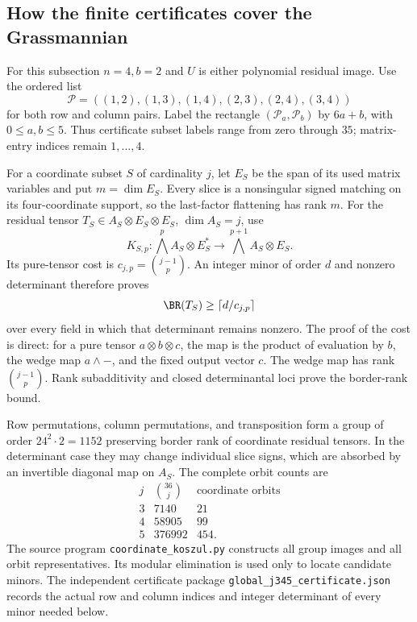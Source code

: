 
\subsection{How the finite certificates cover the Grassmannian}

For this subsection \(n=4,b=2\) and \(U\) is either polynomial
residual image. Use the ordered list
\[
 \mathcal P=((1,2),(1,3),(1,4),(2,3),(2,4),(3,4))
\]
for both row and column pairs. Label the rectangle
\((\mathcal P_a,\mathcal P_b)\) by \(6a+b\), with
\(0\leq a,b\leq5\). Thus certificate subset labels range from
zero through \(35\); matrix-entry indices remain \(1,\ldots,4\).

For a coordinate subset \(S\) of cardinality \(j\), let
\(E_S\) be the span of its used matrix variables and put
\(m= \dim E_S\). Every slice is a nonsingular signed matching
on its four-coordinate support, so the last-factor flattening
has rank \(m\). For the residual tensor
\(T_S\in A_S\otimes E_S\otimes E_S\), \(\dim A_S=j\), use
\[
 K_{S,p}:\bigwedge^p A_S\otimes E_S^*
 \longrightarrow \bigwedge^{p+1}A_S\otimes E_S.
\]
Its pure-tensor cost is \(c_{j,p}=\binom{j-1}{p}\).
An integer minor of order \(d\) and nonzero determinant
therefore proves
\[
 \BR(T_S)\geq \left\lceil d/c_{j,p}\right\rceil
\]
over every field in which that determinant remains nonzero.
The proof of the cost is direct: for a pure tensor
\(a\otimes b\otimes c\), the map is the product of evaluation
by \(b\), the wedge map \(a\wedge-\), and the fixed output
vector \(c\). The wedge map has rank \(\binom{j-1}{p}\).
Rank subadditivity and closed determinantal loci prove the
border-rank bound.

Row permutations, column permutations, and transposition form
a group of order \(24^2\cdot2=1152\) preserving border rank
of coordinate residual tensors. In the determinant case they
may change individual slice signs, which are absorbed by
an invertible diagonal map on \(A_S\).
The complete orbit counts are
\[
 \begin{array}{c|r|r}
 j&\binom{36}{j}&\text{coordinate orbits}\\ \hline
 3&7140&21\\
 4&58905&99\\
 5&376992&454.
 \end{array}
\]
The source program \texttt{coordinate\_koszul.py} constructs
all group images and all orbit representatives. Its modular
elimination is used only to locate candidate minors.
The independent certificate package
\texttt{global\_j345\_certificate.json} records the actual
row and column indices and integer determinant of every
minor needed below.

